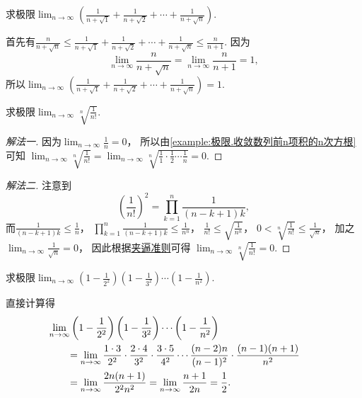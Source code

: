 \begin{example}
求极限\(\lim_{n\to\infty} \left(\frac1{n+\sqrt1}+\frac1{n+\sqrt2}+\dotsb+\frac1{n+\sqrt{n}}\right)\).
\begin{solution}
首先有\(\frac{n}{n+\sqrt{n}}
\leq \frac1{n+\sqrt1}+\frac1{n+\sqrt2}+\dotsb+\frac1{n+\sqrt{n}}
\leq \frac{n}{n+1}\).
因为\begin{equation*}
	\lim_{n\to\infty} \frac{n}{n+\sqrt{n}}
	= \lim_{n\to\infty} \frac{n}{n+1} = 1,
\end{equation*}
所以\(\lim_{n\to\infty} \left(\frac1{n+\sqrt1}+\frac1{n+\sqrt2}+\dotsb+\frac1{n+\sqrt{n}}\right) = 1\).
\end{solution}
\end{example}

\begin{example}
求极限\(\lim_{n\to\infty} \sqrt[n]{\frac1{n!}}\).
\begin{solution}\let\qed\relax
\begin{proof}[解法一]
因为\(\lim_{n\to\infty} \frac1n = 0\)，
所以由\cref{example:极限.收敛数列前n项积的n次方根} 可知
\(\lim_{n\to\infty} \sqrt[n]{\frac1{n!}}
= \lim_{n\to\infty} \sqrt[n]{\frac11 \cdot \frac12 \dotsm \frac1n}
= 0\).
\end{proof}
\begin{proof}[解法二]
注意到\begin{equation*}
	\left(\frac1{n!}\right)^2
	= \prod_{k=1}^n \frac1{(n-k+1)k},%
\end{equation*}
而\(\frac1{(n-k+1)k} \leq \frac1n\)，
\(\prod_{k=1}^n \frac1{(n-k+1)k} \leq \frac1{n^n}\)，
\(\frac1{n!} \leq \sqrt{\frac1{n^n}}\)，
\(0 < \sqrt[n]{\frac1{n!}} \leq \frac1{\sqrt{n}}\)，
加之\(\lim_{n\to\infty} \frac1{\sqrt{n}} = 0\)，
因此根据\hyperref[theorem:数列极限.夹逼准则]{夹逼准则}可得
\(\lim_{n\to\infty} \sqrt[n]{\frac1{n!}} = 0\).
\end{proof}
\end{solution}
\end{example}

\begin{example}
求极限\(\lim_{n\to\infty} \left(1-\frac1{2^2}\right) \left(1-\frac1{3^2}\right) \dotsm \left(1-\frac1{n^2}\right)\).
\begin{solution}
直接计算得\begin{align*}
	&\hspace{-20pt}
	\lim_{n\to\infty} \left(1-\frac1{2^2}\right) \left(1-\frac1{3^2}\right) \dotsm \left(1-\frac1{n^2}\right) \\
	&= \lim_{n\to\infty} \frac{1\cdot3}{2^2} \cdot \frac{2\cdot4}{3^2} \cdot \frac{3\cdot5}{4^2} \dotsm \frac{(n-2)n}{(n-1)^2} \cdot \frac{(n-1)(n+1)}{n^2} \\
	&= \lim_{n\to\infty} \frac{2n(n+1)}{2^2 n^2}
	= \lim_{n\to\infty} \frac{n+1}{2n}
	= \frac12.
\end{align*}
\end{solution}
\end{example}

